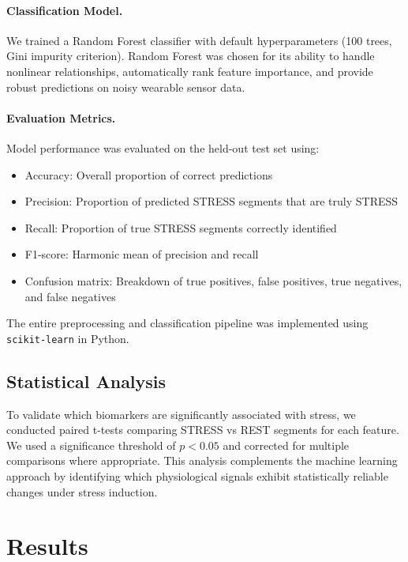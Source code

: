 \documentclass[12pt,letterpaper]{article}
\begin{document}
\paragraph{Classification Model.} We trained a Random Forest classifier with default hyperparameters (100 trees, Gini impurity criterion). Random Forest was chosen for its ability to handle nonlinear relationships, automatically rank feature importance, and provide robust predictions on noisy wearable sensor data.

\paragraph{Evaluation Metrics.} Model performance was evaluated on the held-out test set using:
\begin{itemize}
    \item Accuracy: Overall proportion of correct predictions
    \item Precision: Proportion of predicted STRESS segments that are truly STRESS
    \item Recall: Proportion of true STRESS segments correctly identified
    \item F1-score: Harmonic mean of precision and recall
    \item Confusion matrix: Breakdown of true positives, false positives, true negatives, and false negatives
\end{itemize}

The entire preprocessing and classification pipeline was implemented using \texttt{scikit-learn} in Python.

\subsection{Statistical Analysis}

To validate which biomarkers are significantly associated with stress, we conducted paired t-tests comparing STRESS vs REST segments for each feature. We used a significance threshold of $p < 0.05$ and corrected for multiple comparisons where appropriate. This analysis complements the machine learning approach by identifying which physiological signals exhibit statistically reliable changes under stress induction.



\section{Results}
\end{document}
